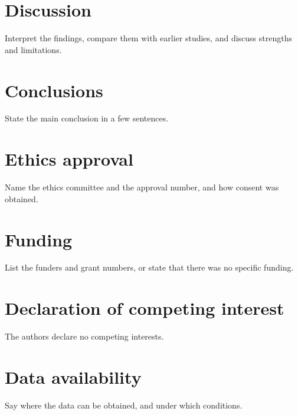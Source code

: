 \documentclass[a4paper,fleqn]{cas-sc}
\begin{document}
\section{Discussion}
Interpret the findings, compare them with earlier studies, and discuss
strengths and limitations.

\section{Conclusions}
State the main conclusion in a few sentences.

\section*{Ethics approval}
Name the ethics committee and the approval number, and how consent was obtained.

\section*{Funding}
List the funders and grant numbers, or state that there was no specific funding.

\section*{Declaration of competing interest}
The authors declare no competing interests.

\section*{Data availability}
Say where the data can be obtained, and under which conditions.

\printcredits



\end{document}
